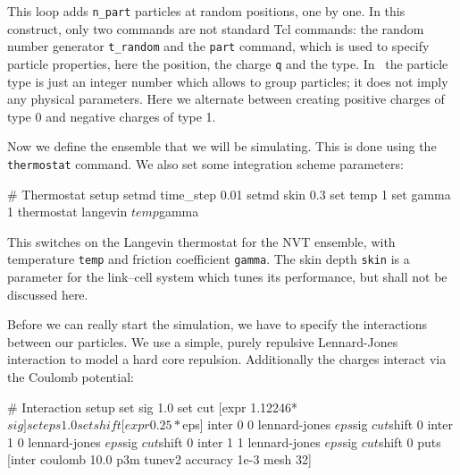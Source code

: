 \documentclass[
a4paper,                        %
11pt,                           %
twoside,                        %
footsepline,                    %
headsepline,                    %
headexclude,                    %
footexclude,                    %
pagesize,                       %
]{scrartcl}
\begin{document}

This loop adds \verb|n_part| particles at random positions, one by
one.  In this construct, only two commands are not standard Tcl
commands: the random number generator \verb|t_random| and the
\verb|part| command, which is used to specify particle properties,
here the position, the charge \verb|q| and the type. In \es\ the
particle type is just an integer number which allows to group
particles; it does not imply any physical parameters. Here we 
alternate between creating positive charges of type 0 and negative
charges of type 1.

Now we define the ensemble that we will be simulating. This is done
using the \verb|thermostat| command. We also set some integration
scheme parameters:

\begin{tclcode}
  # Thermostat setup
  setmd time_step 0.01
  setmd skin 0.3
  set temp 1
  set gamma 1
  thermostat langevin $temp $gamma
\end{tclcode}

This switches on the Langevin thermostat for the NVT ensemble, with
temperature \verb|temp| and friction coefficient \verb|gamma|. The skin depth
\verb|skin| is a parameter for the link--cell system which tunes its
performance, but shall not be discussed here.

Before we can really start the simulation, we have to specify the
interactions between our particles.  We use a simple, purely repulsive
Lennard-Jones interaction to model a hard core repulsion. Additionally the
charges interact via the Coulomb potential:

\begin{tclcode}
  # Interaction setup
  set sig 1.0
  set cut [expr 1.12246*$sig]
  set eps 1.0
  set shift [expr 0.25*$eps]
  inter 0 0 lennard-jones $eps $sig $cut $shift 0
  inter 1 0 lennard-jones $eps $sig $cut $shift 0
  inter 1 1 lennard-jones $eps $sig $cut $shift 0
  puts [inter coulomb 10.0 p3m tunev2 accuracy 1e-3 mesh 32]
\end{tclcode}
\end{document}
